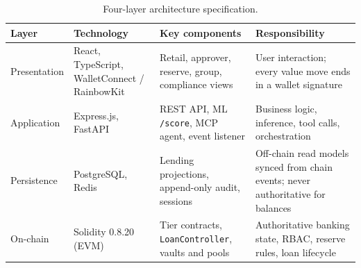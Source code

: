 \documentclass[11pt,a4paper]{article}
\newcommand{\tablehead}{\rowcolor{HeadShade}\bfseries}
\begin{document}
\begin{table}[H]
\centering
\footnotesize
\caption{Four-layer architecture specification.}
\label{tab:four-layer}
\begin{tabular}{@{}>{\raggedright\arraybackslash}p{2.3cm}>{\raggedright\arraybackslash}p{3.4cm}>{\raggedright\arraybackslash}p{3.8cm}>{\raggedright\arraybackslash}p{4.3cm}@{}}
\toprule
\tablehead Layer & Technology & Key components & Responsibility \\
\midrule
Presentation & React, TypeScript, WalletConnect / RainbowKit & Retail, approver, reserve, group, compliance views & User interaction; every value move ends in a wallet signature \\
\rowcolor{RowShade}
Application & Express.js, FastAPI & REST API, ML \texttt{/score}, MCP agent, event listener & Business logic, inference, tool calls, orchestration \\
Persistence & PostgreSQL, Redis & Lending projections, append-only audit, sessions & Off-chain read models synced from chain events; never authoritative for balances \\
\rowcolor{RowShade}
On-chain & Solidity 0.8.20 (EVM) & Tier contracts, \texttt{LoanController}, vaults and pools & Authoritative banking state, RBAC, reserve rules, loan lifecycle \\
\bottomrule
\end{tabular}
\end{table}
\end{document}
